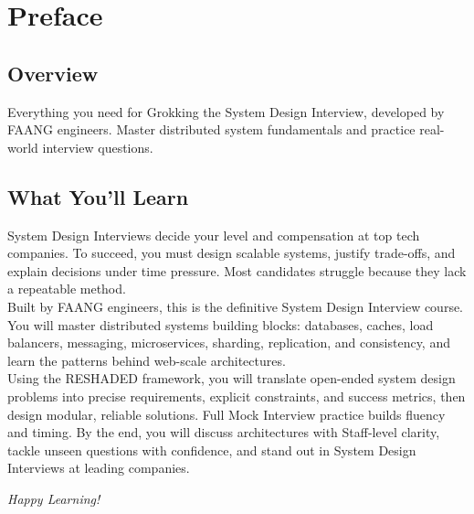 \documentclass[../Main.tex]{subfiles}
\begin{document}
\chapter*{Preface}

\section*{Overview}
Everything you need for Grokking the System Design Interview, developed by FAANG engineers. Master distributed system fundamentals and practice real-world interview questions.

\section*{What You'll Learn}
System Design Interviews decide your level and compensation at top tech companies. To succeed, you must design scalable systems, justify trade-offs, and explain decisions under time pressure. Most candidates struggle because they lack a repeatable method.
\\
Built by FAANG engineers, this is the definitive System Design Interview course. You will master distributed systems building blocks: databases, caches, load balancers, messaging, microservices, sharding, replication, and consistency, and learn the patterns behind web-scale architectures.
\\
Using the RESHADED framework, you will translate open-ended system design problems into precise requirements, explicit constraints, and success metrics, then design modular, reliable solutions. Full Mock Interview practice builds fluency and timing. By the end, you will discuss architectures with Staff-level clarity, tackle unseen questions with confidence, and stand out in System Design Interviews at leading companies.

\vspace{0.5cm}
\textit{Happy Learning!}
\end{document}
